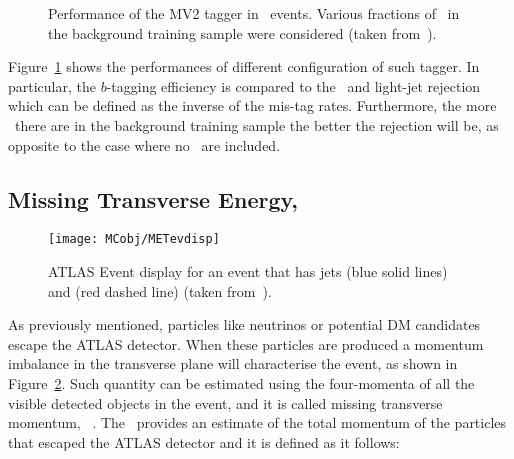 			\begin{figure}[!htb]
				\begin{center}
					\hspace{0.05\textwidth}
				\end{center}
				\caption{Performance of the MV2 tagger in \ttbar\ events. Various fractions of \cjs\ in the background training sample were considered (taken from~\cite{ATL-PHYS-PUB-2016-012}).}
				\label{fig:btagEff}
			\end{figure}

			Figure~\ref{fig:btagEff} shows the performances of different configuration of such tagger. In particular, the $b$-tagging efficiency is compared to the \cjs\ and light-jet rejection which can be defined as the inverse of the mis-tag rates. Furthermore, the more \cj\ there are in the background training sample the better the rejection will be, as opposite to the case where no \cjs\ are included. 



		\subsection*{Missing Transverse Energy, \met}

			\begin{figure}[!htb]
				\centering
				\texttt{[image: MCobj/METevdisp]}
				\caption{\label{fig:METevdisp}ATLAS Event display for an event that has jets (blue solid lines) and \met (red dashed line) (taken from~\cite{METevdisp}).}
			\end{figure}

			As previously mentioned, particles like neutrinos or potential \ac{DM} candidates escape the \ac{ATLAS} detector. When these particles are produced a momentum imbalance in the transverse plane will characterise the event, as shown in Figure~\ref{fig:METevdisp}. Such quantity can be estimated using the four-momenta of all the visible detected objects in the event, and it is called missing transverse momentum, \ptmiss~\cite{ATLASMet2015}. The \ptmiss\ provides an estimate of the total momentum of the particles that escaped the \ac{ATLAS} detector and it is defined as it follows: 

